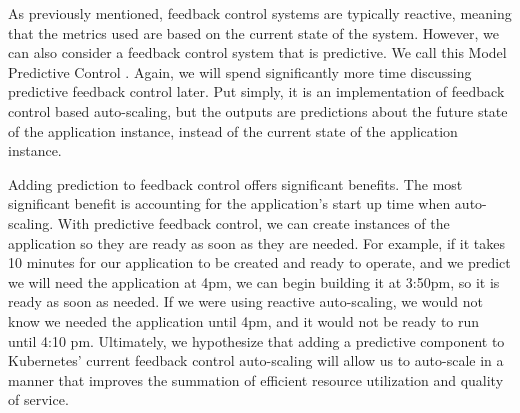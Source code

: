 As previously mentioned, feedback control systems are typically reactive,
meaning that the metrics used are based on the current state of the system.
However, we can also consider a feedback control system that is predictive. We
call this Model Predictive Control
\cite{auto-scaling-techniques-for-elastic-applications-in-cloud-environments}.
Again, we will spend significantly more time discussing predictive feedback
control later. Put simply, it is an implementation of feedback control
based auto-scaling, but the outputs are predictions about the future state of
the application instance, instead of the current state of the application instance.

Adding prediction to feedback control offers significant benefits. The most
significant benefit is accounting for the application's start up time when auto-scaling.
With predictive feedback control, we can create instances of the application
so they are ready as soon as they are needed. For example, if it takes 10
minutes for our application to be created and ready to operate, and we predict
we will need the application at 4pm, we can begin building it at 3:50pm, so it
is ready as soon as needed. If we were using reactive auto-scaling, we
would not know we needed the application until 4pm, and it would not be ready to
run until 4:10 pm. Ultimately, we hypothesize that adding a predictive component to
Kubernetes' current feedback control auto-scaling will allow us to auto-scale in
a manner that improves the summation of efficient resource utilization and
quality of service.
